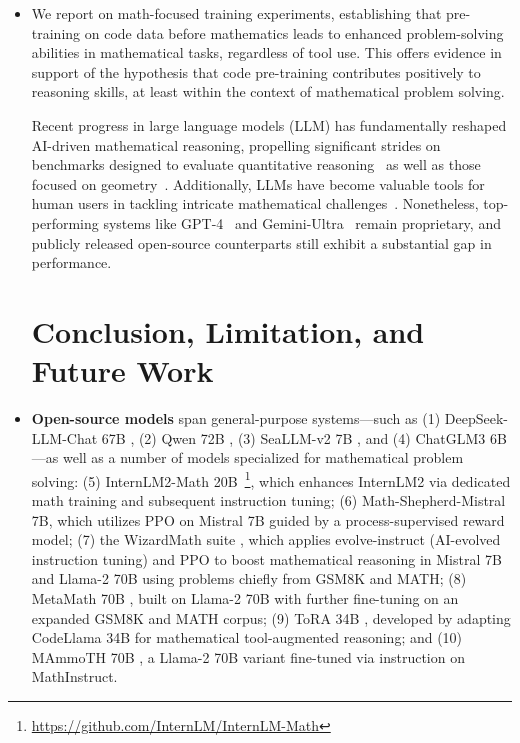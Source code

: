 \begin{itemize}[topsep=0pt]
\begin{itemize}[topsep=0pt]
    \item We report on math-focused training experiments, establishing that pre-training on code data before mathematics leads to enhanced problem-solving abilities in mathematical tasks, regardless of tool use. This offers evidence in support of the hypothesis that code pre-training contributes positively to reasoning skills, at least within the context of mathematical problem solving.

Recent progress in large language models (LLM) has fundamentally reshaped AI-driven mathematical reasoning, propelling significant strides on benchmarks designed to evaluate quantitative reasoning~\citep{MATH} as well as those focused on geometry~\citep{trinh2024solving}. Additionally, LLMs have become valuable tools for human users in tackling intricate mathematical challenges~\citep{tao}. Nonetheless, top-performing systems like GPT-4~\citep{gpt4} and Gemini-Ultra~\citep{gemini} remain proprietary, and publicly released open-source counterparts still exhibit a substantial gap in performance.

\section{Conclusion, Limitation, and Future Work} 

\item \textbf{Open-source models} span general-purpose systems—such as (1) DeepSeek-LLM-Chat 67B \citep{deepseek-llm}, (2) Qwen 72B \citep{qwen}, (3) SeaLLM-v2 7B \citep{seallm}, and (4) ChatGLM3 6B \citep{chatglm3}—as well as a number of models specialized for mathematical problem solving: (5) InternLM2-Math 20B~\footnote{\url{https://github.com/InternLM/InternLM-Math}}, which enhances InternLM2 via dedicated math training and subsequent instruction tuning; (6) Math-Shepherd-Mistral 7B, which utilizes PPO \citep{schulman2017proximal} on Mistral 7B \citep{mistral} guided by a process-supervised reward model; (7) the WizardMath suite \citep{wizardmath}, which applies evolve-instruct (AI-evolved instruction tuning) and PPO to boost mathematical reasoning in Mistral 7B and Llama-2 70B \citep{llama2} using problems chiefly from GSM8K and MATH; (8) MetaMath 70B \citep{metamath}, built on Llama-2 70B with further fine-tuning on an expanded GSM8K and MATH corpus; (9) ToRA 34B \cite{tora}, developed by adapting CodeLlama 34B for mathematical tool-augmented reasoning; and (10) MAmmoTH 70B \citep{MathInstruct}, a Llama-2 70B variant fine-tuned via instruction on MathInstruct.


\end{itemize}
\end{itemize}
